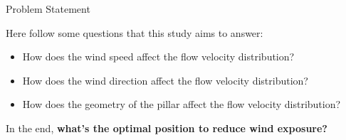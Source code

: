 \begin{frame}{Problem Statement}

    Here follow some questions that this study aims to answer:

    \begin{itemize}
        \item How does the wind speed affect the flow velocity distribution?
        \item How does the wind direction affect the flow velocity distribution?
        \item How does the geometry of the pillar affect the flow velocity distribution?
    \end{itemize}

    \vspace{9pt}

    In the end, \textbf{what's the optimal position to reduce wind exposure?}

\end{frame}
